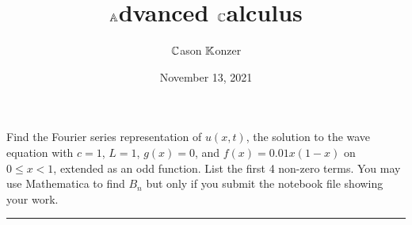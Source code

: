 \documentclass[10pt]{article}
\title{$\mathbb{A}$dvanced $\mathbb{C}$alculus}
\author{$\mathbb{C}$ason $\mathbb{K}$onzer}
\date{November 13, 2021}
\begin{document}
\maketitle

\newpage

\section{\underline{}}
\label{sec: Problem 1}

\noindent
Find the Fourier series representation of $ u(x,t) $, the solution to the wave equation with
$ c = 1 $, $ L = 1 $, $ g(x) = 0 $, and $ f(x) = 0.01x(1 - x) $ on $ 0 \le x < 1 $, extended as an odd function.
List the first 4 non-zero terms. You may use Mathematica to find $ B_n $ but only if you submit the notebook file showing your work. \\
\vspace{2.5mm}

\hrule

\vspace{7.5mm}
\end{document}
